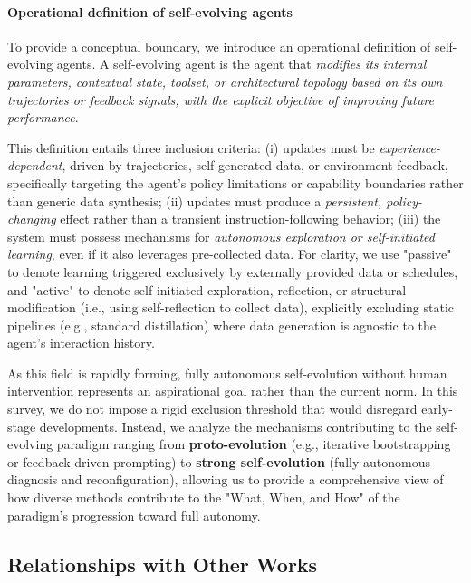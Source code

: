 \documentclass[10pt]{article} %
\begin{document}
\paragraph{Operational definition of self-evolving agents}
To provide a conceptual boundary, we introduce an operational definition of self-evolving agents. 
A self-evolving agent is the agent that \emph{modifies its internal parameters, contextual state, toolset, or architectural topology based on its own trajectories or feedback signals, with the explicit objective of improving future performance}. 

This definition entails three inclusion criteria: 
(i) updates must be \emph{experience-dependent}, driven by trajectories, self-generated data, or environment feedback, specifically targeting the agent's policy limitations or capability boundaries rather than generic data synthesis; 
(ii) updates must produce a \emph{persistent, policy-changing} effect rather than a transient instruction-following behavior; 
(iii) the system must possess mechanisms for \emph{autonomous exploration or self-initiated learning}, even if it also leverages pre-collected data. For clarity, we use "passive" to denote learning triggered exclusively by externally provided data or schedules, and "active" to denote self-initiated exploration, reflection, or structural modification (i.e., using self-reflection to collect data), explicitly excluding static pipelines (e.g., standard distillation) where data generation is agnostic to the agent's interaction history.

As this field is rapidly forming, fully autonomous self-evolution without human intervention represents an aspirational goal rather than the current norm. In this survey, we do not impose a rigid exclusion threshold that would disregard early-stage developments. Instead, we analyze the mechanisms contributing to the self-evolving paradigm ranging from \textbf{proto-evolution} (e.g., iterative bootstrapping or feedback-driven prompting) to \textbf{strong self-evolution} (fully autonomous diagnosis and reconfiguration), allowing us to provide a comprehensive view of how diverse methods contribute to the "What, When, and How" of the paradigm's progression toward full autonomy.





\subsection{Relationships with Other Works}
\end{document}

